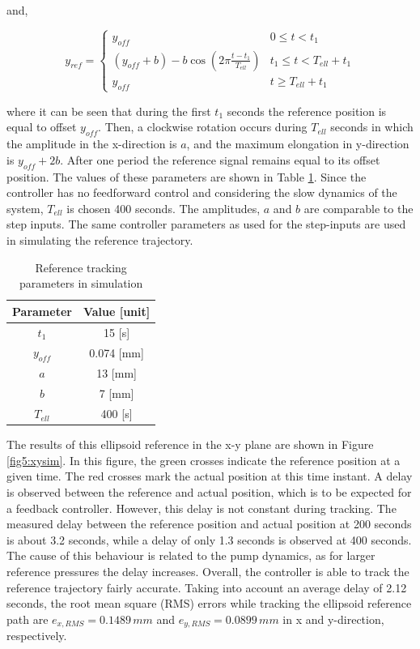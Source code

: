 and,


\begin{equation}
    y_{ref} = \begin{cases} 
       y_{off} &  0 \leq t < t_1 \\
     (y_{off} +b) -  b \cos(2\pi \frac{t - t_1}{T_{ell}}) & t_1 \leq t < T_{ell} + t_1 \\
     y_{off} & t \geq T_{ell} + t_1
   \end{cases}  
   \end{equation}

where it can be seen that during the first $t_1$ seconds the reference position is equal to offset $y_{off}$. Then, a clockwise rotation occurs during $T_{ell}$ seconds in which the amplitude in the x-direction is $a$, and the maximum elongation in y-direction is $y_{off} + 2b$. After one period the reference signal remains equal to its offset position. The values of these parameters are shown in Table \ref{tab5:refparamssim}. Since the controller has no feedforward control and considering the slow dynamics of the system, $T_{ell}$ is chosen 400 seconds. The amplitudes, $a$ and $b$ are comparable to the step inputs. The same controller parameters as used for the step-inputs are used in simulating the reference trajectory.


\begin{table}[H]
    \centering
    \caption{Reference tracking parameters in simulation}
    \begin{tabular}{|c|c|} \hline
   \textbf{Parameter}  & \textbf{Value [unit]} \\ \hline
    $t_1$ &   15 [s]  \\ 
    $y_{off}$ & 0.074 [mm] \\
    $a$ & 13 [mm] \\
    $b$ & 7 [mm] \\
    $T_{ell}$ & 400 [s] \\ \hline
\end{tabular}
    \label{tab5:refparamssim}
\end{table}


The results of this ellipsoid reference in the x-y plane are shown in Figure \ref{fig5:xysim}. In this figure, the green crosses indicate the reference position at a given time. The red crosses mark the actual position at this time instant. A delay is observed between the reference and actual position, which is to be expected for a feedback controller. However, this delay is not constant during tracking. The measured delay between the reference position and actual position at 200 seconds is about 3.2 seconds, while a delay of only 1.3 seconds is observed at 400 seconds. The cause of this behaviour is related to the pump dynamics, as for larger reference pressures the delay increases. Overall, the controller is able to track the reference trajectory fairly accurate. Taking into account an average delay of 2.12 seconds, the root mean square (RMS) errors while tracking the ellipsoid reference path are $e_{x,RMS} = 0.1489 \hspace{2pt} mm$ and $e_{y,RMS} =0.0899 \hspace{2pt} mm$ in x and y-direction, respectively.

